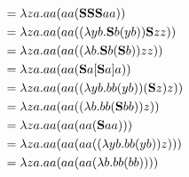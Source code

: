 	\begin{align*}
		& = \lambda za.a a (a a (\textbf{SSS} a a))\\
		& = \lambda za.a a (a a ((\lambda yb.\textbf{S} b (y b)) \textbf{S} z z))\\
		& = \lambda za.a a (a a ((\lambda b.\textbf{S} b (\textbf{S} b)) z z))\\
		& = \lambda za.a a (a a (\textbf{S} a [\textbf{S} a] a))\\
		& = \lambda za.a a (a a ((\lambda yb.b b (y b)) (\textbf{S} z) z))\\
		& = \lambda za.a a (a a ((\lambda b.b b (\textbf{S} b b)) z))\\
		& = \lambda za.a a (a a (a a (\textbf{S} a a)))\\
		& = \lambda za.a a (a a (a a ((\lambda yb.b b (y b)) z)))\\
		& = \lambda za.a a (a a (a a (\lambda b.b b (b b))))\\
	\end{align*}
	